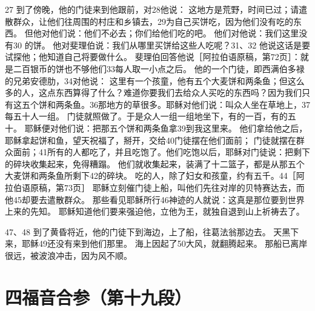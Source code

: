 27  到了傍晚，他的门徒来到他跟前，对28他说： 这地方是荒野，时间已过；请遣散群众，让他们往周围的村庄和乡镇去，29为自己买饼吃，因为他们没有吃的东西。 但他对他们说：他们不必去；你们给他们吃的吧。 他们对他说：我们这里没有30 的饼。 他对斐理伯说：我们从哪里买饼给这些人吃呢？31、32  他说这话是要试探他；他知道自己将要做什么。 斐理伯回答他说［阿拉伯语原稿，第72页］：就是二百银币的饼也不够他们33每人取一小点之后。 他的一个门徒，即西满伯多禄的兄弟安德肋，34对他说： 这里有一个孩童，他有五个大麦饼和两条鱼；但这么多的人，这点东西算得了什么？难道你要我们去给众人买吃的东西吗？因为我们只有这五个饼和两条鱼。36那地方的草很多。耶稣对他们说：叫众人坐在草地上，37每五十人一组。 门徒就照做了。于是众人一组一组地坐下，有的一百，有的五十。 耶稣便对他们说：把那五个饼和两条鱼拿39到我这里来。 他们拿给他之后，耶稣拿起饼和鱼，望天祝福了，掰开，交给40门徒摆在他们面前； 门徒就摆在群众面前；41所有的人都吃了，并且吃饱了。他们吃饱以后，耶稣对门徒说：把剩下的碎块收集起来，免得糟蹋。 他们就收集起来，装满了十二篮子，都是从那五个大麦饼和两条鱼所剩下42的碎块。 吃的人，除了妇女和孩童，约有五千。44［阿拉伯语原稿，第73页］ 耶稣立刻催门徒上船，叫他们先往对岸的贝特赛达去，而他45却要去遣散群众。 那些看见耶稣所行46神迹的人就说：这真是那位要到世界上来的先知。 耶稣知道他们要来强迫他，立他为王，就独自退到山上祈祷去了。\par

47、48  到了黄昏将近，他的门徒下到海边，上了船，往葛法翁那边去。 天黑下来，耶稣49还没有来到他们那里。 海上因起了50大风，就翻腾起来。 那船已离岸很远，被波浪冲击，因为风不顺。\par



\section{四福音合参（第十九段）}

